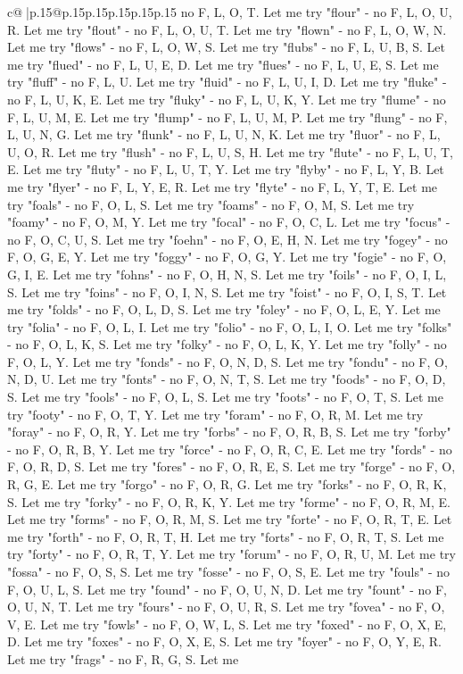 \documentclass{article}
\begin{document}
{\begin{supertabular}{c@{$\;$}|p{.15\linewidth}@{}p{.15\linewidth}p{.15\linewidth}p{.15\linewidth}p{.15\linewidth}p{.15\linewidth}}
{{{no F, L, O, T. Let me try "flour" {-} no F, L, O, U, R. Let me try "flout" {-} no F, L, O, U, T. Let me try "flown" {-} no F, L, O, W, N. Let me try "flows" {-} no F, L, O, W, S. Let me try "flubs" {-} no F, L, U, B, S. Let me try "flued" {-} no F, L, U, E, D. Let me try "flues" {-} no F, L, U, E, S. Let me try "fluff" {-} no F, L, U. Let me try "fluid" {-} no F, L, U, I, D. Let me try "fluke" {-} no F, L, U, K, E. Let me try "fluky" {-} no F, L, U, K, Y. Let me try "flume" {-} no F, L, U, M, E. Let me try "flump" {-} no F, L, U, M, P. Let me try "flung" {-} no F, L, U, N, G. Let me try "flunk" {-} no F, L, U, N, K. Let me try "fluor" {-} no F, L, U, O, R. Let me try "flush" {-} no F, L, U, S, H. Let me try "flute" {-} no F, L, U, T, E. Let me try "fluty" {-} no F, L, U, T, Y. Let me try "flyby" {-} no F, L, Y, B. Let me try "flyer" {-} no F, L, Y, E, R. Let me try "flyte" {-} no F, L, Y, T, E. Let me try "foals" {-} no F, O, L, S. Let me try "foams" {-} no F, O, M, S. Let me try "foamy" {-} no F, O, M, Y. Let me try "focal" {-} no F, O, C, L. Let me try "focus" {-} no F, O, C, U, S. Let me try "foehn" {-} no F, O, E, H, N. Let me try "fogey" {-} no F, O, G, E, Y. Let me try "foggy" {-} no F, O, G, Y. Let me try "fogie" {-} no F, O, G, I, E. Let me try "fohns" {-} no F, O, H, N, S. Let me try "foils" {-} no F, O, I, L, S. Let me try "foins" {-} no F, O, I, N, S. Let me try "foist" {-} no F, O, I, S, T. Let me try "folds" {-} no F, O, L, D, S. Let me try "foley" {-} no F, O, L, E, Y. Let me try "folia" {-} no F, O, L, I. Let me try "folio" {-} no F, O, L, I, O. Let me try "folks" {-} no F, O, L, K, S. Let me try "folky" {-} no F, O, L, K, Y. Let me try "folly" {-} no F, O, L, Y. Let me try "fonds" {-} no F, O, N, D, S. Let me try "fondu" {-} no F, O, N, D, U. Let me try "fonts" {-} no F, O, N, T, S. Let me try "foods" {-} no F, O, D, S. Let me try "fools" {-} no F, O, L, S. Let me try "foots" {-} no F, O, T, S. Let me try "footy" {-} no F, O, T, Y. Let me try "foram" {-} no F, O, R, M. Let me try "foray" {-} no F, O, R, Y. Let me try "forbs" {-} no F, O, R, B, S. Let me try "forby" {-} no F, O, R, B, Y. Let me try "force" {-} no F, O, R, C, E. Let me try "fords" {-} no F, O, R, D, S. Let me try "fores" {-} no F, O, R, E, S. Let me try "forge" {-} no F, O, R, G, E. Let me try "forgo" {-} no F, O, R, G. Let me try "forks" {-} no F, O, R, K, S. Let me try "forky" {-} no F, O, R, K, Y. Let me try "forme" {-} no F, O, R, M, E. Let me try "forms" {-} no F, O, R, M, S. Let me try "forte" {-} no F, O, R, T, E. Let me try "forth" {-} no F, O, R, T, H. Let me try "forts" {-} no F, O, R, T, S. Let me try "forty" {-} no F, O, R, T, Y. Let me try "forum" {-} no F, O, R, U, M. Let me try "fossa" {-} no F, O, S, S. Let me try "fosse" {-} no F, O, S, E. Let me try "fouls" {-} no F, O, U, L, S. Let me try "found" {-} no F, O, U, N, D. Let me try "fount" {-} no F, O, U, N, T. Let me try "fours" {-} no F, O, U, R, S. Let me try "fovea" {-} no F, O, V, E. Let me try "fowls" {-} no F, O, W, L, S. Let me try "foxed" {-} no F, O, X, E, D. Let me try "foxes" {-} no F, O, X, E, S. Let me try "foyer" {-} no F, O, Y, E, R. Let me try "frags" {-} no F, R, G, S. Let me }}}
\end{supertabular}}
\end{document}
